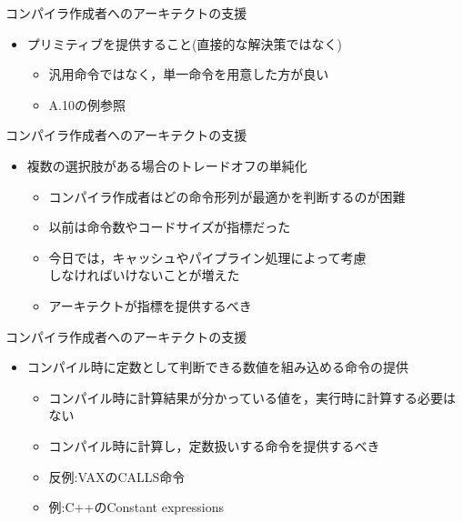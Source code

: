 \documentclass[dvipdfmx]{beamer}
\begin{document}
	\begin{frame}{コンパイラ作成者へのアーキテクトの支援}
		\begin{itemize}
			\item プリミティブを提供すること(直接的な解決策ではなく)
				\begin{itemize}
					\item 汎用命令ではなく，単一命令を用意した方が良い
					\item A.10の例参照
				\end{itemize}
		\end{itemize}
	\end{frame}

	\begin{frame}{コンパイラ作成者へのアーキテクトの支援}
		\begin{itemize}
			\item 複数の選択肢がある場合のトレードオフの単純化
				\begin{itemize}
					\item コンパイラ作成者はどの命令形列が最適かを判断するのが困難
					\item 以前は命令数やコードサイズが指標だった
					\item 今日では，キャッシュやパイプライン処理によって考慮\\しなければいけないことが増えた
					\item アーキテクトが指標を提供するべき
				\end{itemize}
		\end{itemize}
	\end{frame}

	\begin{frame}{コンパイラ作成者へのアーキテクトの支援}
		\begin{itemize}
			\item コンパイル時に定数として判断できる数値を組み込める命令の提供
				\begin{itemize}
					\item コンパイル時に計算結果が分かっている値を，実行時に計算する必要はない
					\item コンパイル時に計算し，定数扱いする命令を提供するべき
					\item 反例:VAXのCALLS命令
					\item 例:C++のConstant expressions
				\end{itemize}
		\end{itemize}
	\end{frame}
\end{document}
